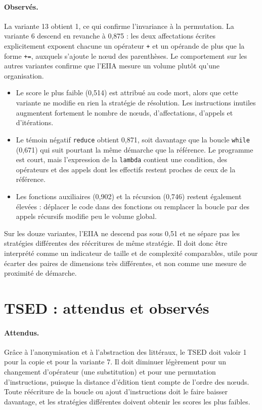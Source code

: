 \documentclass[12pt,a4paper,oneside]{report}
\begin{document}
\paragraph{Observés.}
La variante 13 obtient 1, ce qui confirme l'invariance à la permutation. La
variante 6 descend en revanche à 0,875 : les deux affectations écrites
explicitement exposent chacune un opérateur \texttt{+} et un opérande de plus
que la forme \texttt{+=}, auxquels s'ajoute le nœud des parenthèses. Le
comportement sur les autres variantes confirme que l'EIIA mesure un volume
plutôt qu'une organisation.
\begin{itemize}
  \item Le score le plus faible (0,514) est attribué au code mort, alors que
        cette variante ne modifie en rien la stratégie de résolution. Les
        instructions inutiles augmentent fortement le nombre de nœuds,
        d'affectations, d'appels et d'itérations.
  \item Le témoin négatif \texttt{reduce} obtient 0,871, soit davantage que la
        boucle \texttt{while} (0,671) qui suit pourtant la même démarche que
        la référence. Le programme est court, mais l'expression de la
        \texttt{lambda} contient une condition, des opérateurs et des appels
        dont les effectifs restent proches de ceux de la référence.
  \item Les fonctions auxiliaires (0,902) et la récursion (0,746) restent
        également élevées : déplacer le code dans des fonctions ou remplacer
        la boucle par des appels récursifs modifie peu le volume global.
\end{itemize}
Sur les douze variantes, l'EIIA ne descend pas sous 0,51 et ne sépare pas les
stratégies différentes des réécritures de même stratégie. Il doit donc être
interprété comme un indicateur de taille et de complexité comparables, utile
pour écarter des paires de dimensions très différentes, et non comme une
mesure de proximité de démarche.

\section{TSED : attendus et observés}

\paragraph{Attendus.}
Grâce à l'anonymisation et à l'abstraction des littéraux, le TSED doit valoir
1 pour la copie et pour la variante 7. Il doit diminuer légèrement pour un
changement d'opérateur (une substitution) et pour une permutation
d'instructions, puisque la distance d'édition tient compte de l'ordre des
nœuds. Toute réécriture de la boucle ou ajout d'instructions doit le faire
baisser davantage, et les stratégies différentes doivent obtenir les scores
les plus faibles.
\end{document}
